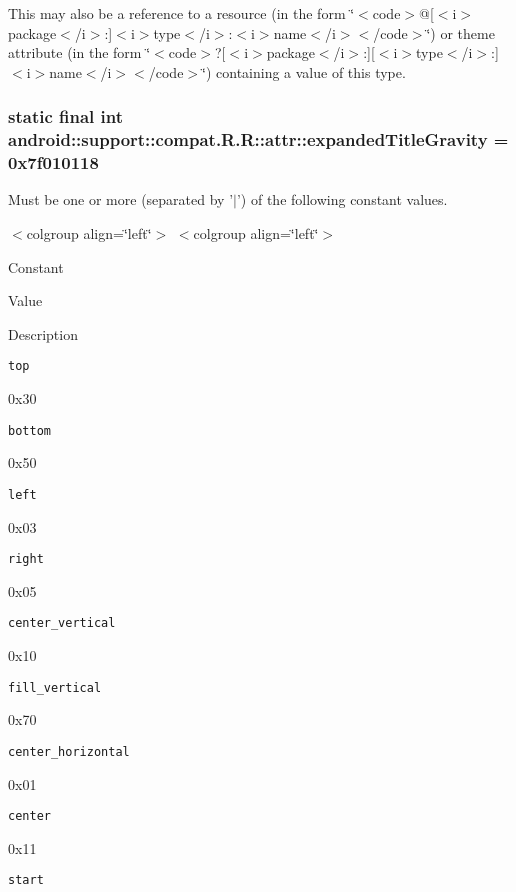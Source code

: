 This may also be a reference to a resource (in the form \char`\"{}$<$code$>$@\mbox{[}$<$i$>$package$<$/i$>$:\mbox{]}$<$i$>$type$<$/i$>$:$<$i$>$name$<$/i$>$$<$/code$>$\char`\"{}) or theme attribute (in the form \char`\"{}$<$code$>$?\mbox{[}$<$i$>$package$<$/i$>$:\mbox{]}\mbox{[}$<$i$>$type$<$/i$>$:\mbox{]}$<$i$>$name$<$/i$>$$<$/code$>$\char`\"{}) containing a value of this type. \hypertarget{classandroid_1_1support_1_1compat_1_1_r_1_1attr_adcca357a9d4e35c12aade49b845ada4}{
\subsubsection[{expandedTitleGravity}]{\setlength{\rightskip}{0pt plus 5cm}static final int android::support::compat.R.R::attr::expandedTitleGravity = 0x7f010118}}
\label{classandroid_1_1support_1_1compat_1_1_r_1_1attr_adcca357a9d4e35c12aade49b845ada4}


Must be one or more (separated by '$|$') of the following constant values. \begin{TabularC}{0}
\hline
\end{TabularC}
$<$colgroup align=\char`\"{}left\char`\"{}$>$ $<$colgroup align=\char`\"{}left\char`\"{}$>$ 

Constant

Value

Description 

{\tt top}

0x30

{\tt bottom}

0x50

{\tt left}

0x03

{\tt right}

0x05

{\tt center\_\-vertical}

0x10

{\tt fill\_\-vertical}

0x70

{\tt center\_\-horizontal}

0x01

{\tt center}

0x11

{\tt start}


